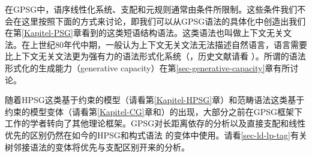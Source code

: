 在GPSG中，语序线性化系统、支配和元规则通常由条件所限制。这些条件我们不会在这里按照下面的方式来讨论，即我们可以从GPSG语法的具体化中创造出我们在第\ref{Kapitel-PSG}章看到的这类短语结构语法。这类语法也叫做上下文无关文法。在上世纪80年代中期，一般认为上下文无关文法无法描述自然语言，语言需要比上下文无关文法更为强有力的语法形式化系统（\citealp{Shieber85a,Culy85a}，历史文献请看 ）。所谓的语法形式化的生成能力（generative capacity）在第\ref{sec-generative-capacity}章有所讨论。

随着HPSG这类基于约束的模型（请看第\ref{Kapitel-HPSG}章）和范畴语法这类基于约束的模型变体（请看第\ref{Kapitel-CG}章和\citealp{Uszkoreit86d}）的出现，大部分之前在GPSG框架下工作的学者转向了其他理论框架。GPSG对长距离依存的分析以及直接支配和线性优先的区别仍然在如今的HPSG\indexhpsgc 和构式语法\indexcxgc
的变体中使用。请看\ref{sec-ld-lp-tag}有关树邻接语法的变体将优先与支配区别开来的分析。


